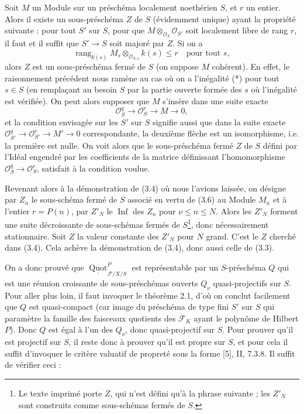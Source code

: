  Soit $M$ un Module sur un préschéma localement noethérien
$S$, et $r$ un entier. Alors il existe un sous-préschéma $Z$ de $S$
(évidemment unique) ayant la propriété suivante : pour tout $S'$ sur $S$, pour
que $M\otimes_{\mathcal O_S}\mathcal O_{S'}$ soit localement libre de rang $r$,
il faut et il suffit que $S'\longrightarrow S$ soit majoré par $Z$. Si on a
\[
\operatorname{rang}_{k(s)}
M_s\otimes_{\mathcal O_{S,s}}k(s)\leq r
\quad\text{pour tout $s$},
\]
alors $Z$ est un sous-préschéma fermé de $S$ (on suppose $M$ cohérent).
En effet, le raisonnement précédent nous ramène au cas où on a l'inégalité (*)
pour tout $s\in S$ (en remplaçant au besoin $S$ par la partie ouverte formée
des $s$ où l'inégalité est vérifiée). On peut alors supposer que $M$ s'insère
dans une suite exacte
\[
\mathcal O_S^q\longrightarrow\mathcal O_S^r\longrightarrow M\longrightarrow0,
\]
et la condition envisagée sur les $S'$ sur $S$ signifie aussi que dans la suite
exacte $\mathcal O_{S'}^q\longrightarrow\mathcal O_{S'}^r
\longrightarrow M'\longrightarrow0$ correspondante, la deuxième flèche est un
isomorphisme, i.e. la première est nulle. On voit alors que le sous-préschéma
fermé $Z$ de $S$ défini par l'Idéal engendré par les coefficients de la matrice
définissant l'homomorphisme
$\mathcal O_S^q\longrightarrow\mathcal O_S^r$, satisfait à la condition voulue.

Revenant alors à la démonstration de (3.4) où nous l'avions laissée, on désigne
par $Z_n$ le sous-schéma fermé de $S$ associé en vertu de (3.6) au Module $M_n$
et à l'entier $r=P(n)$, par $Z'_N$ le $\operatorname{Inf}$ des $Z_n$ pour
$\nu\leq n\leq N$. Alors les $Z'_N$ forment une suite décroissante de
sous-schémas fermés de $S$\footnote{Le texte imprimé porte $Z$, qui n'est défini qu'à la phrase suivante ; les $Z'_N$ sont construits comme sous-schémas fermés de $S$.}, donc nécessairement stationnaire. Soit $Z$ la
valeur constante des $Z'_N$ pour $N$ grand. C'est le $Z$ cherché dans (3.4).
Cela achève la démonstration de (3.4), donc aussi celle de (3.3).

On a donc prouvé que
$\underline{\operatorname{Quot}}^P_{\mathcal F/X/S}$ est représentable par un
$S$-préschéma $Q$ qui est une réunion croissante de sous-préschémas ouverts
$Q_\nu$ quasi-projectifs sur $S$. Pour aller plus loin, il faut invoquer le
théorème 2.1, d'où on conclut facilement que $Q$ est quasi-compact (car image du
préschéma de type fini $S'$ sur $S$ qui paramètre la famille des faisceaux
quotients des $\mathcal F_K$ ayant le polynôme de Hilbert $P$). Donc $Q$ est
égal à l'un des $Q_\nu$, donc quasi-projectif sur $S$. Pour prouver qu'il est
projectif sur $S$, il reste donc à prouver qu'il est propre sur $S$, et pour
cela il suffit d'invoquer le critère valuatif de propreté sous la forme [5],
II, 7.3.8. Il suffit de vérifier ceci :

